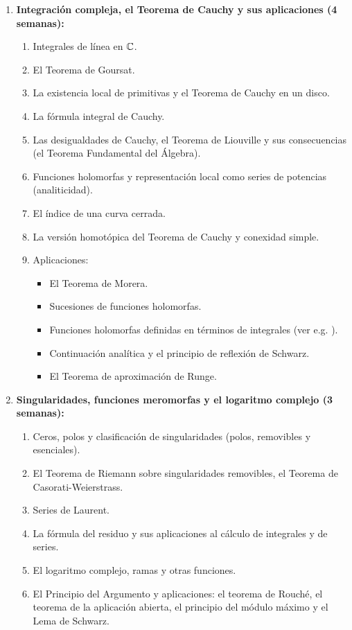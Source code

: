 \begin{refsection}
\begin{enumerate}
\item \textbf{Integración compleja, el Teorema de Cauchy y sus aplicaciones (4 semanas):} 
\begin{enumerate}
    \item Integrales de línea en $\mathbb{C}$.
    \item El Teorema de Goursat.
    \item La existencia local de primitivas y el Teorema de Cauchy en un disco.
    \item La fórmula integral de Cauchy.
    \item Las desigualdades de Cauchy, el Teorema de Liouville y sus consecuencias (el Teorema Fundamental del Álgebra).
    \item Funciones holomorfas y representación local como series de potencias (analiticidad).
    \item El índice de una curva cerrada.
    \item La versión homotópica del Teorema de Cauchy y conexidad simple.
    \item Aplicaciones:
    \begin{itemize}
        \item El Teorema de Morera.
        \item Sucesiones de funciones holomorfas.
        \item Funciones holomorfas definidas en términos de integrales (ver e.g. \cite[\S 5.3]{Con78}).
        \item Continuación analítica y el principio de reflexión de Schwarz.
        \item El Teorema de aproximación de Runge.
    \end{itemize}
\end{enumerate}

\item \textbf{Singularidades, funciones meromorfas y el logaritmo complejo (3 semanas):} 
\begin{enumerate}
    \item Ceros, polos y clasificación de singularidades (polos, removibles y esenciales).
    \item El Teorema de Riemann  sobre singularidades removibles, el Teorema de Casorati-Weierstrass.
    \item Series de Laurent.
    \item La fórmula del residuo y sus aplicaciones al cálculo de integrales y de series.
    \item El logaritmo complejo, ramas y otras funciones.
    \item El Principio del Argumento y aplicaciones: el teorema de Rouché, el teorema de la aplicación abierta, el principio del módulo máximo y el Lema de Schwarz.
\end{enumerate}


\end{enumerate}
\end{refsection}
